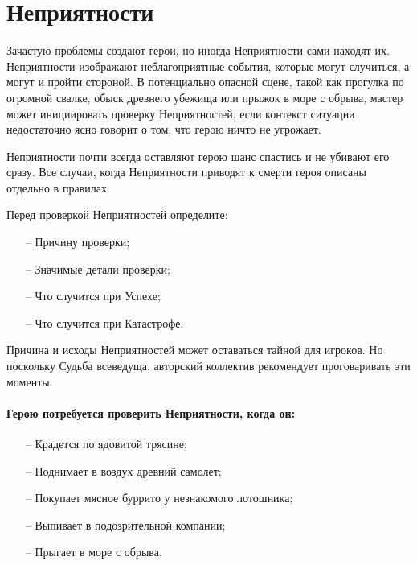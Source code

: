 \section{Неприятности}
Зачастую проблемы создают герои, но иногда Неприятности сами находят их. Неприятности изображают неблагоприятные события, которые могут случиться, а могут и пройти стороной. В потенциально опасной сцене, такой как прогулка по огромной свалке, обыск древнего убежища или прыжок в море с обрыва, мастер может инициировать проверку Неприятностей, если контекст ситуации недостаточно ясно говорит о том, что герою ничто не угрожает.

\begin{tcolorbox}
    Неприятности почти всегда оставляют герою шанс спастись и не убивают его сразу. Все случаи, когда Неприятности приводят к смерти героя описаны отдельно в правилах.
\end{tcolorbox}

Перед проверкой Неприятностей определите:
\begin{itemize}
    \item[--] Причину проверки;
    \item[--] Значимые детали проверки;
    \item[--] Что случится при Успехе;
    \item[--] Что случится при Катастрофе.
\end{itemize}

\begin{tcolorbox}
    Причина и исходы Неприятностей может оставаться тайной для игроков. Но поскольку Судьба всеведуща, авторский коллектив рекомендует проговаривать эти моменты.
\end{tcolorbox}

\paragraph{Герою потребуется проверить Неприятности, когда он:}
\begin{itemize}
    \item[--] Крадется по ядовитой трясине;
    \item[--] Поднимает в воздух древний самолет;
    \item[--] Покупает мясное буррито у незнакомого лотошника;
    \item[--] Выпивает в подозрительной компании;
    \item[--] Прыгает в море с обрыва.
\end{itemize}

